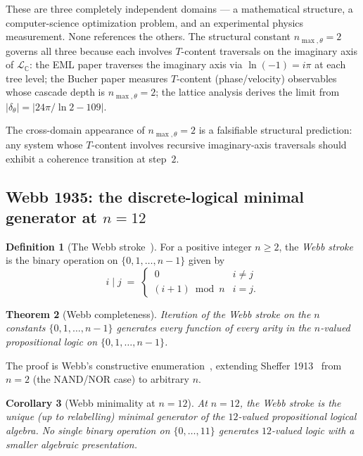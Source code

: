 \documentclass[11pt,a4paper]{article}
\newtheorem{theorem}{Theorem}[section]
\newtheorem{corollary}[theorem]{Corollary}
\theoremstyle{definition}
\newtheorem{definition}[theorem]{Definition}
\theoremstyle{remark}
\newcommand{\C}{\mathbb{C}}
\begin{document}
These are three completely independent domains --- a mathematical structure, a computer-science optimization problem, and an experimental physics measurement. None references the others. The structural constant $n_{\max,\theta}=2$ governs all three because each involves $T$-content traversals on the imaginary axis of $\mathcal{L}_{\C}$: the EML paper traverses the imaginary axis via $\ln(-1) = i\pi$ at each tree level; the Bucher paper measures $T$-content (phase/velocity) observables whose cascade depth is $n_{\max,\theta}=2$; the lattice analysis derives the limit from $|\delta_{\theta}| = |24\pi/\ln 2 - 109|$.

The cross-domain appearance of $n_{\max,\theta}=2$ is a falsifiable structural prediction: any system whose $T$-content involves recursive imaginary-axis traversals should exhibit a coherence transition at step~$2$.

\subsection{Webb 1935: the discrete-logical minimal generator at $n=12$}\label{subsec:webb}

\begin{definition}[The Webb stroke~\cite{Webb1935}]\label{def:webb}
For a positive integer $n\ge 2$, the \emph{Webb stroke} is the binary operation on $\{0,1,\ldots,n-1\}$ given by
\[
i \mathbin{|} j \;=\; \begin{cases}\, 0 & i \neq j \\ (i+1) \bmod n & i = j.\end{cases}
\]
\end{definition}

\begin{theorem}[Webb completeness]\label{thm:webb-complete}
Iteration of the Webb stroke on the $n$ constants $\{0,1,\ldots,n-1\}$ generates every function of every arity in the $n$-valued propositional logic on $\{0,1,\ldots,n-1\}$.
\end{theorem}

The proof is Webb's constructive enumeration~\cite{Webb1935}, extending Sheffer 1913~\cite{Sheffer1913} from $n=2$ (the NAND/NOR case) to arbitrary $n$.

\begin{corollary}[Webb minimality at $n=12$]\label{cor:webb-minimal}
At $n=12$, the Webb stroke is the unique (up to relabelling) minimal generator of the $12$-valued propositional logical algebra. No single binary operation on $\{0,\ldots,11\}$ generates $12$-valued logic with a smaller algebraic presentation.
\end{corollary}
\end{document}
